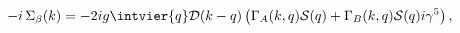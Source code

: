 \begin{equation*}
-i\,\Sigma_\beta(k)=-2ig\intvier{q}\mathcal{D}(k-q)\left(\Gamma_A(k,q)
\mathcal{S}(q)+\Gamma_B(k,q) \mathcal{S}(q) i\gamma^5\right),
\end{equation*}

